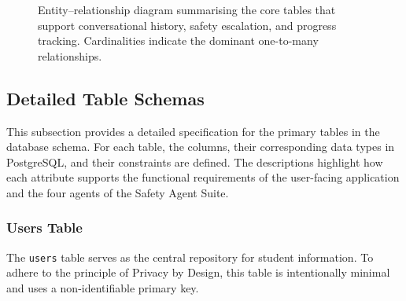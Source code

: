 \begin{figure}[h]
    \caption{Entity--relationship diagram summarising the core tables that support conversational history, safety escalation, and progress tracking. Cardinalities indicate the dominant one-to-many relationships.}
    \label{fig:erd}
\end{figure}

\subsection{Detailed Table Schemas}

This subsection provides a detailed specification for the primary tables in the database schema. For each table, the columns, their corresponding data types in PostgreSQL, and their constraints are defined. The descriptions highlight how each attribute supports the functional requirements of the user-facing application and the four agents of the Safety Agent Suite.

\subsubsection{Users Table}
The \texttt{users} table serves as the central repository for student information. To adhere to the principle of Privacy by Design, this table is intentionally minimal and uses a non-identifiable primary key.

